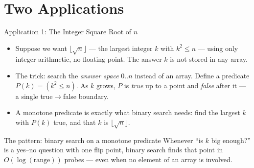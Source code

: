 \documentclass[aspectratio=169]{beamer}
\begin{document}

\section{Two Applications}


\begin{frame}{Application 1: The Integer Square Root of $n$}
  \begin{itemize}
    \item Suppose we want $\lfloor \sqrt{n} \rfloor$ --- the largest integer
      $k$ with $k^2 \le n$ --- using only integer arithmetic, no floating
      point. The answer $k$ is not stored in any array.
    \item The trick: search the \emph{answer space} $0..n$ instead of an
      array. Define a predicate $P(k) = (k^2 \le n)$. As $k$ grows, $P$ is
      \emph{true} up to a point and \emph{false} after it --- a single
      true$\to$false boundary.
    \item A monotone predicate is exactly what binary search needs: find the
      largest $k$ with $P(k)$ true, and that $k$ is $\lfloor \sqrt{n}
      \rfloor$.
  \end{itemize}
  \begin{alertblock}{The pattern: binary search on a monotone predicate}
    Whenever ``is $k$ big enough?'' is a yes--no question with one flip
    point, binary search finds that point in $O(\log(\text{range}))$ probes
    --- even when no element of an array is involved.
  \end{alertblock}
\end{frame}
\end{document}
